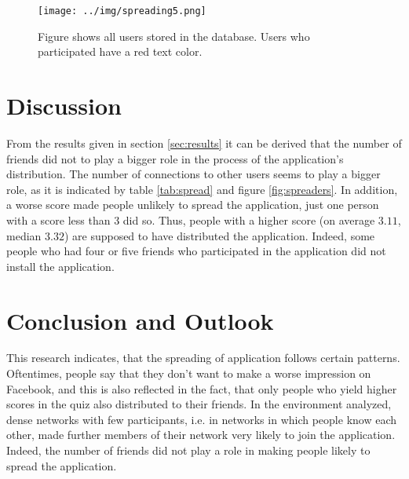 \documentclass[preprint,12pt]{elsarticle}
\begin{document}
\begin{figure}
  \texttt{[image: ../img/spreading5.png]}
\caption{Figure shows all users stored in the database. Users who
  participated have a red text color.}
\label{fig:spreading}
\end{figure}








\section{Discussion}
\label{sec:discussion}
From the results given in section \ref{sec:results} it can be derived
that the number of friends did not to play a bigger role in the
process of the application's distribution. The number of connections
to other users seems to play a bigger 
role, as it is indicated by table \ref{tab:spread} and figure
\ref{fig:spreaders}. In addition, a worse score made people unlikely
to spread the application, just one person with a score less than 3
did so. Thus, people with a higher score (on average $3.11$, median $3.32$) are
supposed to have distributed the application. Indeed, some people who
had four or five friends who participated in the application did not
install the application.


\section{Conclusion and Outlook}
\label{sec:conclusion}
This research indicates, that the spreading of application follows
certain patterns. Oftentimes, people say that they don't want to
make a worse impression on Facebook, and this is also reflected in the
fact, that only people who yield higher scores in the quiz also
distributed to their friends. In the environment analyzed, dense
networks with few participants, i.e. in networks in which people know
each other, made  further members of their network very likely to join
the application. Indeed, the number of friends did not play a role in
making people likely to spread the application.
\end{document}
